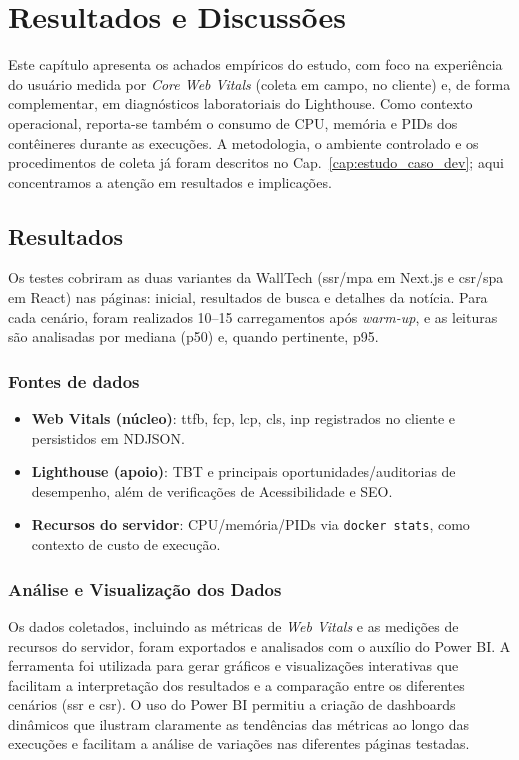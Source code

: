\chapter{Resultados e Discussões}
\label{cap:resultados}

Este capítulo apresenta os achados empíricos do estudo, com foco na experiência do usuário medida por \textit{Core Web Vitals} (coleta em campo, no cliente) e, de forma complementar, em diagnósticos laboratoriais do Lighthouse. Como contexto operacional, reporta-se também o consumo de CPU, memória e PIDs dos contêineres durante as execuções. A metodologia, o ambiente controlado e os procedimentos de coleta já foram descritos no Cap.~\ref{cap:estudo_caso_dev}; aqui concentramos a atenção em resultados e implicações.

\section{Resultados}
Os testes cobriram as duas variantes da WallTech (\acrshort{ssr}/\acrshort{mpa} em Next.js e \acrshort{csr}/\acrshort{spa} em React) nas páginas: inicial, resultados de busca e detalhes da notícia. Para cada cenário, foram realizados 10--15 carregamentos após \textit{warm-up}, e as leituras são analisadas por mediana (p50) e, quando pertinente, p95.

\subsection{Fontes de dados}
\begin{itemize}
    \item \textbf{Web Vitals (núcleo)}: \acrshort{ttfb}, \acrshort{fcp}, \acrshort{lcp}, \acrshort{cls}, \acrshort{inp} registrados no cliente e persistidos em NDJSON.
    \item \textbf{Lighthouse (apoio)}: TBT e principais oportunidades/auditorias de desempenho, além de verificações de Acessibilidade e SEO.
    \item \textbf{Recursos do servidor}: CPU/memória/PIDs via \texttt{docker stats}, como contexto de custo de execução.
\end{itemize}

\subsection{Análise e Visualização dos Dados}
Os dados coletados, incluindo as métricas de \textit{Web Vitals} e as medições de recursos do servidor, foram exportados e analisados com o auxílio do Power BI. A ferramenta foi utilizada para gerar gráficos e visualizações interativas que facilitam a interpretação dos resultados e a comparação entre os diferentes cenários (\acrshort{ssr} e \acrshort{csr}). O uso do Power BI permitiu a criação de dashboards dinâmicos que ilustram claramente as tendências das métricas ao longo das execuções e facilitam a análise de variações nas diferentes páginas testadas.

